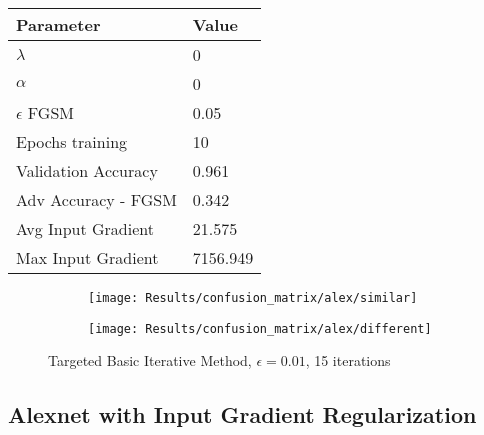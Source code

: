 \documentclass[draft,final]{vutinfth} %
\begin{document}
\begin{table}[h]
  \centering
  \begin{tabular}{ll}
    \toprule
			Parameter			& Value   \\
    \midrule
			$\lambda$								& 0				\\
			$\alpha$								& 0				\\
			$\epsilon$ FGSM					& 0.05		\\
			Epochs training					& 10			\\
			
			Validation Accuracy			& 0.961		\\
			Adv Accuracy - FGSM			& 0.342		\\
			
			Avg Input Gradient			& 21.575	\\
			Max Input Gradient			& 7156.949\\
    \bottomrule
  \end{tabular}
\end{table}


\begin{figure}[h]
  \begin{subfigure}[b]{0.5\columnwidth}
		\centering
    \texttt{[image: Results/confusion\_matrix/alex/similar]}%
    \label{fig:exp:cm:alex:similar}
  \end{subfigure}
  \begin{subfigure}[b]{0.5\columnwidth}
		\centering
    \texttt{[image: Results/confusion\_matrix/alex/different]}
    \label{fig:exp:cm:alex:different}
  \end{subfigure}
  \caption{Targeted Basic Iterative Method, $\epsilon = 0.01$, 15 iterations}
\end{figure}
\clearpage

\subsection{Alexnet with Input Gradient Regularization}
\end{document}
